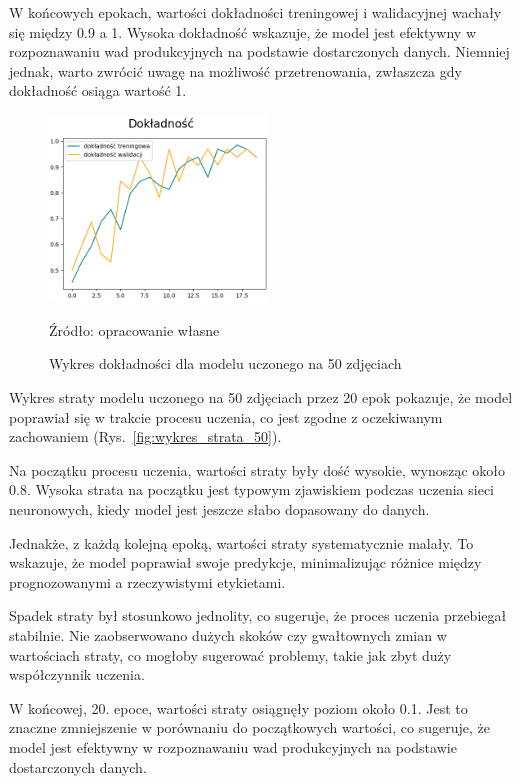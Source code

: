 W końcowych epokach, wartości dokładności treningowej i walidacyjnej wachały się między 0.9 a 1. Wysoka dokładność wskazuje, że model jest efektywny w rozpoznawaniu wad produkcyjnych na podstawie dostarczonych danych. Niemniej jednak, warto zwrócić uwagę na możliwość przetrenowania, zwłaszcza gdy dokładność osiąga wartość 1.

\begin{figure}[htbp]
  \centering
  \caption{Wykres dokładności dla modelu uczonego na 50 zdjęciach}
  \includegraphics[width=220px]{images/dokladnosc_50.png}
  \begin{center}
  \footnotesize{Źródło: opracowanie własne}
  \end{center}
  \label{fig:wykres_dokladnosc_50}
\end{figure}

Wykres straty modelu uczonego na 50 zdjęciach przez 20 epok pokazuje, że model poprawiał się w trakcie procesu uczenia, co jest zgodne z oczekiwanym zachowaniem (Rys.~\ref{fig:wykres_strata_50}).

Na początku procesu uczenia, wartości straty były dość wysokie, wynosząc około 0.8. Wysoka strata na początku jest typowym zjawiskiem podczas uczenia sieci neuronowych, kiedy model jest jeszcze słabo dopasowany do danych.

Jednakże, z każdą kolejną epoką, wartości straty systematycznie malały. To wskazuje, że model poprawiał swoje predykcje, minimalizując różnice między prognozowanymi a rzeczywistymi etykietami.

Spadek straty był stosunkowo jednolity, co sugeruje, że proces uczenia przebiegał stabilnie. Nie zaobserwowano dużych skoków czy gwałtownych zmian w wartościach straty, co mogłoby sugerować problemy, takie jak zbyt duży współczynnik uczenia.

W końcowej, 20. epoce, wartości straty osiągnęły poziom około 0.1. Jest to znaczne zmniejszenie w porównaniu do początkowych wartości, co sugeruje, że model jest efektywny w rozpoznawaniu wad produkcyjnych na podstawie dostarczonych danych.

